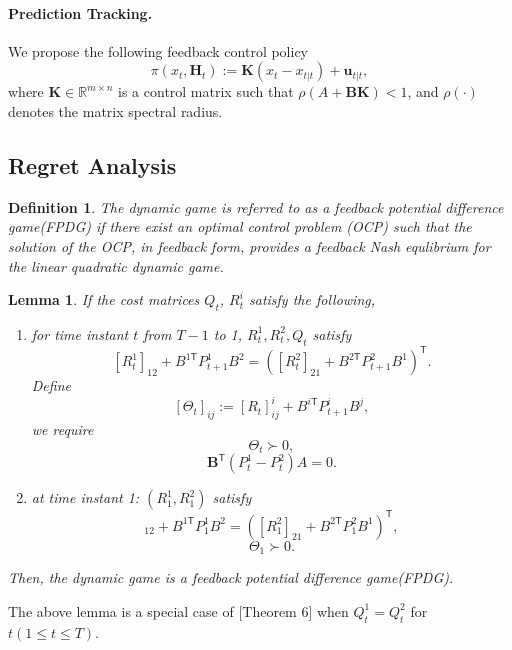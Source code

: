 \documentclass[letterpaper, 10 pt, conference]{ieeeconf}  %
\newcommand{\transpose}{\mathsf{T}}
\newtheorem{lemma}{Lemma}
\newtheorem{definition}{Definition}
\begin{document}
\paragraph{Prediction Tracking. } We propose the following feedback control policy
\begin{equation}
    \pi(x_{t},\mathbf{H}_{t}) := \mathbf{K}(x_{t}-x_{t|t}) + \mathbf{u}_{t|t},
\end{equation}
where $\mathbf{K}\in \mathbb{R}^{m\times n}$ is a control matrix such that $\rho(A+\mathbf{B}\mathbf{K}) < 1$, and $\rho(\cdot)$ denotes the matrix spectral radius.


\subsection{Regret Analysis}

\begin{definition}
    The dynamic game is referred to as a feedback potential difference game(FPDG) if there exist an optimal control problem (OCP) such that the solution of the OCP, in feedback form, provides a feedback Nash equlibrium for the linear quadratic dynamic game. 
\end{definition}

\begin{lemma}
    If the cost matrices $Q_{t}$, $R_{t}^{i}$ satisfy the following,
    \begin{enumerate}
        \item for time instant $t$ from $T-1$ to 1, $R_{t}^{1},R_{t}^{2},Q_{t}$ satisfy
        \begin{equation}\label{eq:costFPDG1}
            [R_{t}^{1}]_{12} + B^{1\transpose}P_{t+1}^{1}B^{2} = ([R_{t}^{2}]_{21} + B^{2\transpose}P_{t+1}^{2}B^{1})^{\transpose}.
        \end{equation}
        Define
        \begin{equation}\label{eq:Theta}
        [\Theta_{t}]_{ij} := [R_{t}]^{i}_{ij} + B^{i\transpose}P_{t+1}^{i}B^{j},
        \end{equation}
        we require
        \begin{equation}
            \Theta_{t} \succ 0,
        \end{equation}
        \begin{equation*}
            \mathbf{B}^{\transpose}(P_{t}^{1}-P_{t}^{2})A=0.
        \end{equation*}
        \item at time instant 1: $(R_{1}^{1},R_{1}^{2})$ satisfy
        \begin{equation}
            [R_{1}^{1}]_{12} + B^{1\transpose}P_{1}^{1}B^{2} = ([R_{1}^{2}]_{21} + B^{2\transpose}P_{1}^{2}B^{1})^{\transpose},
        \end{equation}
        \begin{equation}\label{eq:costFPDG2}
            \Theta_{1} \succ 0.
        \end{equation}
    \end{enumerate}
    Then, the dynamic game is a feedback potential difference game(FPDG).
\end{lemma}
The above lemma is a special case of \cite{}[Theorem 6] when $Q_{t}^{1}=Q_{t}^{2}$ for $t(1\leq t \leq T)$.
\end{document}
